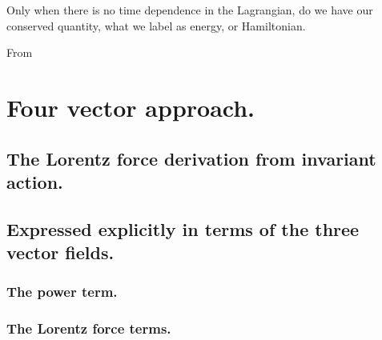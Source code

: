 Only when there is no time dependence in the Lagrangian, do we have our conserved quantity, what we label as energy, or Hamiltonian.

From

\section{Four vector approach.}
\subsection{The Lorentz force derivation from invariant action.}
\subsection{Expressed explicitly in terms of the three vector fields.}
\subsubsection{The power term.}
\subsubsection{The Lorentz force terms.}

\EndArticle
